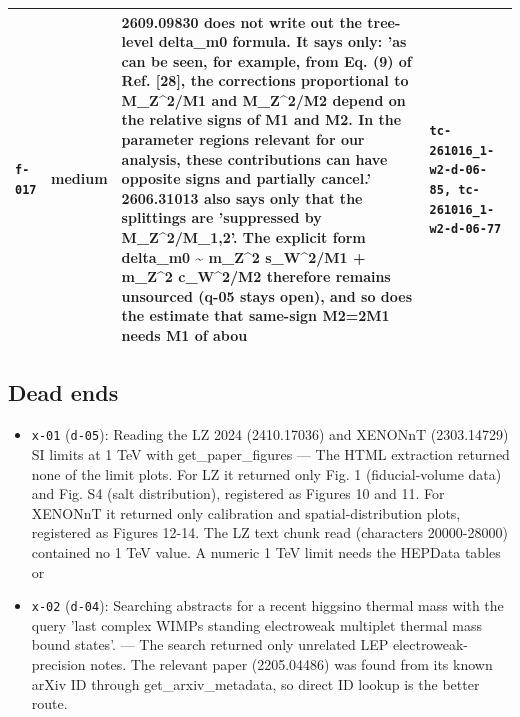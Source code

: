 \documentclass[11pt,a4paper]{article}
\begin{document}
\begin{longtable}{@{}p{}p{}p{}p{}@{}}
\texttt{f-017} & medium & 2609.09830 does not write out the tree-level delta\_m0 formula. It says only: 'as can be seen, for example, from Eq. (9) of Ref. [28], the corrections proportional to M\_Z\textasciicircum{}2/M1 and M\_Z\textasciicircum{}2/M2 depend on the relative signs of M1 and M2. In the parameter regions relevant for our analysis, these contributions can have opposite signs and partially cancel.' 2606.31013 also says only that the splittings are 'suppressed by M\_Z\textasciicircum{}2/M\_1,2'. The explicit form delta\_m0 \textasciitilde{} m\_Z\textasciicircum{}2 s\_W\textasciicircum{}2/M1 + m\_Z\textasciicircum{}2 c\_W\textasciicircum{}2/M2 therefore remains unsourced (q-05 stays open), and so does the estimate that same-sign M2=2M1 needs M1 of abou & \texttt{tc-261016\_\allowbreak{}1-w2-d-06-85,\allowbreak{} tc-261016\_\allowbreak{}1-w2-d-06-77} \\
\bottomrule\end{longtable}
\subsection{Dead ends}
\begin{itemize}
  \item \texttt{x-01} (\texttt{d-05}): Reading the LZ 2024 (2410.17036) and XENONnT (2303.14729) SI limits at 1 TeV with get\_paper\_figures --- The HTML extraction returned none of the limit plots. For LZ it returned only Fig. 1 (fiducial-volume data) and Fig. S4 (salt distribution), registered as Figures 10 and 11. For XENONnT it returned only calibration and spatial-distribution plots, registered as Figures 12-14. The LZ text chunk read (characters 20000-28000) contained no 1 TeV value. A numeric 1 TeV limit needs the HEPData tables or 
  \item \texttt{x-02} (\texttt{d-04}): Searching abstracts for a recent higgsino thermal mass with the query 'last complex WIMPs standing electroweak multiplet thermal mass bound states'. --- The search returned only unrelated LEP electroweak-precision notes. The relevant paper (2205.04486) was found from its known arXiv ID through get\_arxiv\_metadata, so direct ID lookup is the better route.
\end{itemize}
\end{document}
